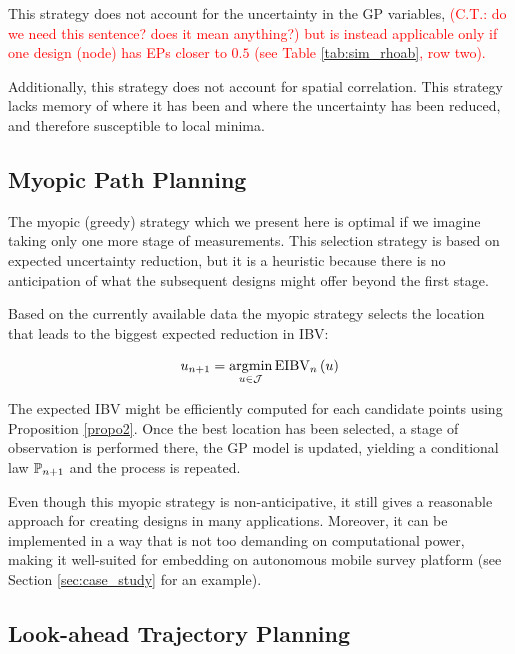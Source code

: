 This strategy does not account for the uncertainty in the GP
variables, \textcolor{red}{(C.T.: do we need this sentence? does it mean anything?) but is instead applicable only if one design (node) has EPs
closer to $0.5$ (see Table \ref{tab:sim_rhoab}, row
two).}

Additionally, this strategy does not account for spatial
correlation. This strategy lacks memory of where it has been and where
the uncertainty has been reduced, and therefore susceptible to local
minima.

\subsection{Myopic Path Planning}
\label{sec:myopic}

The myopic (greedy) strategy which we present here is optimal if we
imagine taking only one more stage of measurements. This selection
strategy is based on expected uncertainty reduction, but it is a
heuristic because there is no anticipation of what the subsequent
designs might offer beyond the first stage.

Based on the currently available data the myopic strategy selects the location that leads to the biggest expected reduction in IBV:
\begin{criterion}[Myopic]
\begin{equation}\label{critSEQ}
    \spatloc_{\stage + 1} = \argmin_{\spatloc \in \candidates} \EIBV_{\stage}\left(\spatloc\right)
\end{equation}
\end{criterion}

The expected IBV might be efficiently computed for each candidate points using Proposition \ref{propo2}. Once the best location has been selected, a stage of observation is performed there, the GP model is updated, yielding a conditional law $\mathbb{P}_{n + 1}$ and the process is repeated.

Even though this myopic strategy is non-anticipative, it still gives a
reasonable approach for creating designs in many
applications. Moreover, it can be implemented in a way that is not too demanding on computational power, making it well-suited for embedding on autonomous mobile survey platform (see Section \ref{sec:case_study} for an example).


\subsection{Look-ahead Trajectory Planning}\label{sec:LA}

